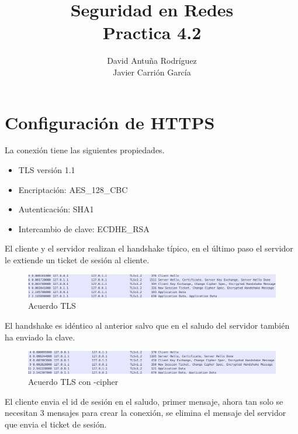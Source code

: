 \documentclass[11pt]{article}
\title{\Large Seguridad en Redes\\Practica 4.2}
\author{David Antuña Rodríguez\\Javier Carrión García}
\date{}
\begin{document}
  \raggedright

  \maketitle
  \newpage

  \section{Configuración de HTTPS}
    \par
    La conexión tiene las siguientes propiedades.
    \begin{itemize}
      \item TLS versión 1.1
      \item Encriptación: AES\_128\_CBC
      \item Autenticación: SHA1
      \item Intercambio de clave: ECDHE\_RSA
    \end{itemize}

    \par
    El cliente y el servidor realizan el handshake típico, en el último paso
    el servidor le extiende un ticket de sesión al cliente.

    \begin{figure}[H]
      \centering
      \includegraphics[width = \textwidth]{tls1}
      \caption{Acuerdo TLS}
    \end{figure}


    \par
    El handshake es idéntico al anterior salvo que en el saludo del servidor
    también ha enviado la clave.

    \begin{figure}[H]
      \centering
      \includegraphics[width = \textwidth]{tls2}
      \caption{Acuerdo TLS con -cipher}
    \end{figure}

    \par
    El cliente envia el id de sesión en el saludo, primer mensaje, ahora tan
    solo se necesitan 3 mensajes para crear la conexión, se elimina el mensaje
    del servidor que envia el ticket de sesión.
\end{document}
